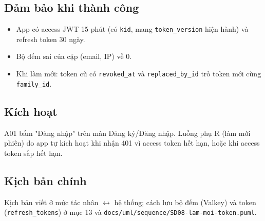 \subsection{Đảm bảo khi thành công}
\begin{itemize}
\item App có access JWT 15 phút (có {\small\texttt{kid}}, mang {\small\texttt{token\_\allowbreak{}\allowbreak{}version}} hiện hành) và refresh token 30 ngày.
\item Bộ đếm sai của cặp (email, IP) về 0.
\item Khi làm mới: token cũ có {\small\texttt{revoked\_\allowbreak{}\allowbreak{}at}} và {\small\texttt{replaced\_\allowbreak{}\allowbreak{}by\_\allowbreak{}\allowbreak{}id}} trỏ token mới cùng {\small\texttt{family\_\allowbreak{}\allowbreak{}id}}.
\end{itemize}
\subsection{Kích hoạt}
A01 bấm "Đăng nhập" trên màn Đăng ký/\allowbreak{}Đăng nhập. Luồng phụ R (làm mới phiên) do app tự kích hoạt khi nhận 401 vì access token hết hạn, hoặc khi access token sắp hết hạn.

\subsection{Kịch bản chính}
Kịch bản viết ở mức tác nhân \ensuremath{\leftrightarrow} hệ thống; cách lưu bộ đếm (Valkey) và token ({\small\texttt{refresh\_\allowbreak{}\allowbreak{}tokens}}) ở mục 13 và {\small\texttt{docs/\allowbreak{}\allowbreak{}uml/\allowbreak{}\allowbreak{}sequence/\allowbreak{}\allowbreak{}SD08-\allowbreak{}lam-\allowbreak{}moi-\allowbreak{}token.\allowbreak{}puml}}.


